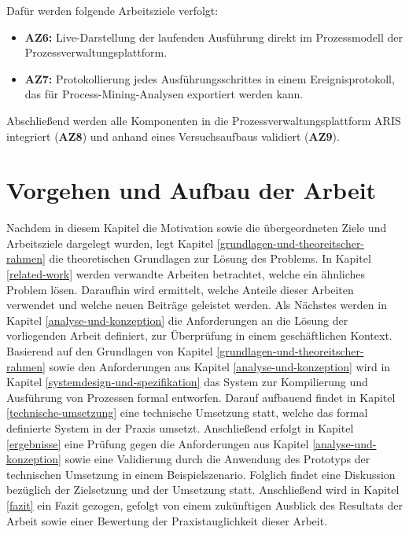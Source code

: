 \noindent Dafür werden folgende Arbeitsziele verfolgt:

\begin{itemize}
  \item \textbf{AZ6:} Live-Darstellung der laufenden Ausführung direkt im Prozessmodell der 
  Prozessverwaltungsplattform.
  \item \textbf{AZ7:} Protokollierung jedes Ausführungsschrittes in einem Ereignisprotokoll, 
  das für Process-Mining-Analysen exportiert werden kann.
\end{itemize}

\noindent Abschließend werden alle Komponenten in die Prozessverwaltungsplattform ARIS integriert (\textbf{AZ8}) und 
anhand eines Versuchsaufbaus validiert (\textbf{AZ9}).

\section{Vorgehen und Aufbau der Arbeit}

Nachdem in diesem Kapitel die Motivation sowie die übergeordneten Ziele und Arbeitsziele 
dargelegt wurden, legt Kapitel \ref{grundlagen-und-theoreitscher-rahmen} die theoretischen 
Grundlagen zur Lösung des Problems. In Kapitel \ref{related-work} werden verwandte Arbeiten betrachtet, 
welche ein ähnliches Problem lösen. Daraufhin wird ermittelt, welche Anteile dieser Arbeiten 
verwendet und welche neuen Beiträge geleistet werden. Als Nächstes werden in Kapitel 
\ref{analyse-und-konzeption} die Anforderungen an die Lösung der vorliegenden Arbeit definiert, 
zur Überprüfung in einem geschäftlichen Kontext. Basierend auf den Grundlagen von Kapitel 
\ref{grundlagen-und-theoreitscher-rahmen} sowie den Anforderungen aus Kapitel 
\ref{analyse-und-konzeption} wird in Kapitel \ref{systemdesign-und-spezifikation} das System 
zur Kompilierung und Ausführung von Prozessen formal entworfen. Darauf aufbauend findet in 
Kapitel \ref{technische-umsetzung} eine technische Umsetzung statt, welche das formal 
definierte System in der Praxis umsetzt. Anschließend erfolgt in Kapitel \ref{ergebnisse} 
eine Prüfung gegen die Anforderungen aus Kapitel \ref{analyse-und-konzeption} sowie eine 
Validierung durch die Anwendung des Prototyps der technischen Umsetzung in einem 
Beispielszenario. Folglich findet eine Diskussion bezüglich der Zielsetzung und der 
Umsetzung statt. Anschließend wird in Kapitel \ref{fazit} ein Fazit gezogen, gefolgt 
von einem zukünftigen Ausblick des Resultats der Arbeit sowie einer Bewertung der 
Praxistauglichkeit dieser Arbeit.
